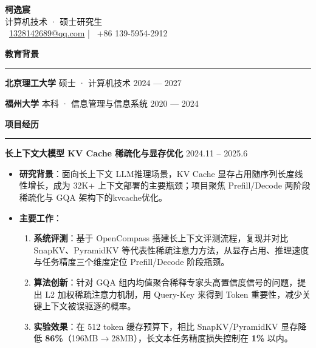 \documentclass[10pt,a4paper]{ctexart}
\makeatletter
\newcommand{\cvsection}[1]{%
  \vspace{3mm}%
  {\large\bfseries\textcolor{sec}{#1}}\par
  \vspace{-0.5mm}
  {\color{sec}\rule[2pt]{\linewidth}{0.55pt}}\vspace{-1mm}
}
\newcommand{\cvname}{\textbf{\fontsize{28}{28}\selectfont 柯逸宸}}
\newcommand{\cvemail}{\href{mailto:1328142689@qq.com}{1328142689@qq.com}}
\newcommand{\cvphone}{+86 139-5954-2912}
\newcommand{\cvrole}{计算机技术 · 硕士研究生}
\makeatother
\begin{document}
\pagestyle{empty}

\begin{center}
  \cvname \\[2pt]
  {\small \cvrole} \\[2pt]
  ~\cvemail
  \quad|\quad
  ~\cvphone
\end{center}

\vspace{1mm}

\cvsection{教育背景}
\vspace{-0.1em}
\textbf{北京理工大学} \quad 硕士 · 计算机技术 \hfill 2024 — 2027

\vspace{1pt}

\textbf{福州大学} \quad 本科 · 信息管理与信息系统  \hfill 2020 — 2024



\cvsection{项目经历}
\vspace{-0.1em}
\textbf{\large 长上下文大模型 KV Cache 稀疏化与显存优化} \hfill {\large 2024.11 -- 2025.6}

\begin{itemize}

\item \textbf{研究背景}：面向长上下文 LLM推理场景，KV Cache 显存占用随序列长度线性增长，成为 32K+ 上下文部署的主要瓶颈；项目聚焦 Prefill/Decode 两阶段稀疏化与 GQA 架构下的kvcache优化。

\item \textbf{主要工作}：
\begin{enumerate}
\item \textbf{系统评测}：基于 OpenCompass 搭建长上下文评测流程，复现并对比 SnapKV、PyramidKV 等代表性稀疏注意力方法，从显存占用、推理速度与任务精度三个维度定位 Prefill/Decode 阶段瓶颈。

\item \textbf{算法创新}：针对 GQA 组内均值聚合稀释专家头高置信度信号的问题，提出 L2 加权稀疏注意力机制，用 Query-Key 来得到 Token 重要性，减少关键上下文被误驱逐的概率。

\item \textbf{实验效果}：在 512 token 缓存预算下，相比 SnapKV/PyramidKV 显存降低 \textbf{86\%}（196MB$\rightarrow$28MB），长文本任务精度损失控制在 \textbf{1\%} 以内。
\end{enumerate}


\end{itemize}
\end{document}
